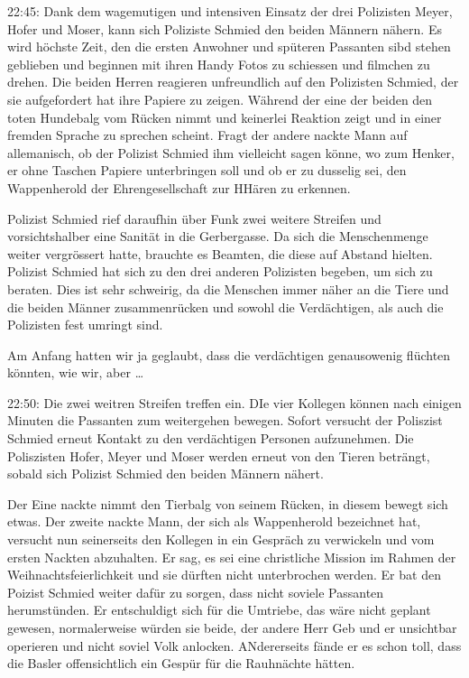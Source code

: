 22:45: Dank dem wagemutigen und intensiven Einsatz der drei Polizisten Meyer, Hofer und Moser, kann sich Poliziste Schmied den beiden Männern nähern. Es wird höchste Zeit, den die ersten Anwohner und spüteren Passanten sibd stehen geblieben und beginnen mit ihren Handy Fotos zu schiessen und filmchen zu drehen. Die beiden Herren reagieren unfreundlich auf den Polizisten Schmied, der sie aufgefordert hat ihre Papiere zu zeigen. Während der eine der beiden den toten Hundebalg vom Rücken nimmt und keinerlei Reaktion zeigt und in einer fremden Sprache zu sprechen scheint. Fragt der andere nackte Mann auf allemanisch, ob der Polizist Schmied ihm vielleicht sagen könne, wo zum Henker, er ohne Taschen Papiere unterbringen soll und ob er zu dusselig sei, den Wappenherold der Ehrengesellschaft zur HHären zu erkennen.

Polizist Schmied rief daraufhin über Funk zwei weitere Streifen und vorsichtshalber eine Sanität in die Gerbergasse. Da sich die Menschenmenge weiter vergrössert hatte, brauchte es Beamten, die diese auf Abstand hielten. Polizist Schmied hat sich zu den drei anderen Polizisten begeben, um sich zu beraten. Dies ist sehr schweirig, da die Menschen immer näher an die Tiere und die beiden Männer zusammenrücken und sowohl die Verdächtigen, als auch die Polizisten fest umringt sind. 

Am Anfang hatten wir ja geglaubt, dass die verdächtigen genausowenig flüchten könnten, wie wir, aber \dots

22:50: Die zwei weitren Streifen treffen ein. DIe vier Kollegen können nach einigen Minuten die Passanten zum weitergehen bewegen. Sofort versucht der Poliszist Schmied erneut Kontakt zu den verdächtigen Personen aufzunehmen. Die Poliszisten Hofer, Meyer und Moser werden erneut von den Tieren beträngt, sobald sich Polizist Schmied den beiden Männern nähert.

Der Eine nackte nimmt den Tierbalg von seinem Rücken, in diesem bewegt sich etwas. Der zweite nackte Mann, der sich als Wappenherold bezeichnet hat, versucht nun seinerseits den Kollegen in ein Gespräch zu verwickeln und vom ersten Nackten abzuhalten. Er sag, es sei eine christliche Mission im Rahmen der Weihnachtsfeierlichkeit und sie dürften nicht unterbrochen werden. Er bat den Poizist Schmied weiter dafür zu sorgen, dass nicht soviele Passanten herumstünden. Er entschuldigt sich für die Umtriebe, das wäre nicht geplant gewesen, normalerweise würden sie beide, der andere Herr Geb und er unsichtbar operieren und nicht soviel Volk anlocken. ANdererseits fände er es schon toll, dass die Basler offensichtlich ein Gespür für die Rauhnächte hätten.

